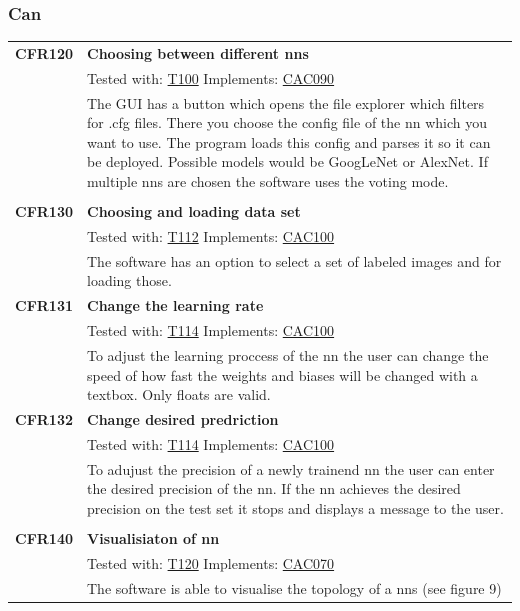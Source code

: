 \documentclass[parskip=full]{scrartcl}
\begin{document}
\subsubsection{Can}
\begin{tabular}{p{2cm}p{11.4cm}}
\textbf{CFR120} \hypertarget{CFR100} & \textbf{Choosing between different \glspl{nn}}\\
& Tested with: \hyperlink{T100}{T100} Implements: \hyperlink{CAC090}{CAC090} \\
& The GUI has a button which opens the file explorer which filters for .cfg files. There you choose the config file of the \gls{nn} which you want to use. The program loads this config and parses it so it can be deployed. Possible models would be GoogLeNet or AlexNet. If multiple \glspl{nn} are chosen the software uses the voting mode.\\
& \\
\textbf {CFR130} \hypertarget{CFR112} & \textbf{Choosing and loading data set} \\
& Tested with: \hyperlink{T112}{T112} Implements: \hyperlink{CAC100}{CAC100}\\
& The software has an option to select a set of labeled images and for loading those.\\
\textbf {CFR131} \hypertarget{CFR114} & \textbf{Change the learning rate} \\
& Tested with: \hyperlink{T114}{T114} Implements: \hyperlink{CAC100}{CAC100} \\
& To adjust the learning proccess of the \gls{nn} the user can change the speed of how fast the weights and biases will be changed with a textbox. Only floats are valid.\\
\textbf{CFR132} \hypertarget{CFR115} & \textbf{Change desired predriction}\\
& Tested with: \hyperlink{T114}{T114} Implements: \hyperlink{CAC100}{CAC100}\\
& To adujust the precision of a newly trainend \gls{nn} the user can enter the desired precision of the \gls{nn}. If the \gls{nn} achieves the desired precision on the test set it stops and displays a message to the user. \\
& \\
\textbf {CFR140} \hypertarget{CFR120} & \textbf{Visualisiaton of \gls{nn}} \\
& Tested with: \hyperlink{T120}{T120} Implements: \hyperlink{CAC070}{CAC070} \\
& The software is able to visualise the topology of a \glspl{nn} (see figure 9) \\

\end{tabular}
\end{document}
